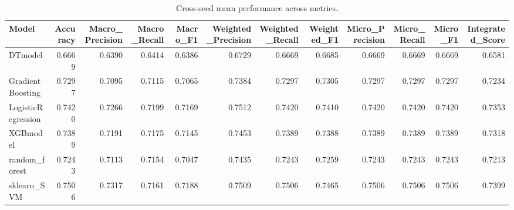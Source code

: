 \begin{table}[t]
\centering
\begin{tabular}{lrrrrrrrrrrr}
\toprule
Model & Accuracy & Macro_Precision & Macro_Recall & Macro_F1 & Weighted_Precision & Weighted_Recall & Weighted_F1 & Micro_Precision & Micro_Recall & Micro_F1 & Integrated_Score \\
\midrule
DTmodel & 0.6669 & 0.6390 & 0.6414 & 0.6386 & 0.6729 & 0.6669 & 0.6685 & 0.6669 & 0.6669 & 0.6669 & 0.6581 \\
GradientBoosting & 0.7297 & 0.7095 & 0.7115 & 0.7065 & 0.7384 & 0.7297 & 0.7305 & 0.7297 & 0.7297 & 0.7297 & 0.7234 \\
LogisticRegression & 0.7420 & 0.7266 & 0.7199 & 0.7169 & 0.7512 & 0.7420 & 0.7410 & 0.7420 & 0.7420 & 0.7420 & 0.7353 \\
XGBmodel & 0.7389 & 0.7191 & 0.7175 & 0.7145 & 0.7453 & 0.7389 & 0.7388 & 0.7389 & 0.7389 & 0.7389 & 0.7318 \\
random_forest & 0.7243 & 0.7113 & 0.7154 & 0.7047 & 0.7435 & 0.7243 & 0.7259 & 0.7243 & 0.7243 & 0.7243 & 0.7213 \\
sklearn_SVM & 0.7506 & 0.7317 & 0.7161 & 0.7188 & 0.7509 & 0.7506 & 0.7465 & 0.7506 & 0.7506 & 0.7506 & 0.7399 \\
\bottomrule
\end{tabular}
\caption{Cross-seed mean performance across metrics.}
\label{tab:cross_seed_mean}
\end{table}
